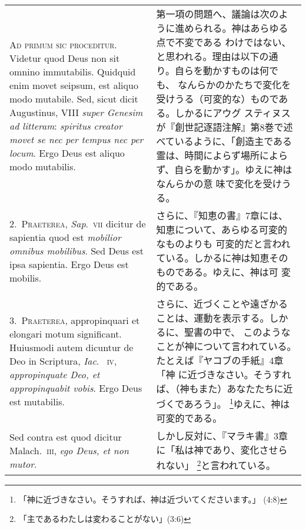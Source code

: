 \documentclass[10pt]{jsarticle} %
\begin{document}
\begin{longtable}{p{21em}p{21em}}
{\huge A}{\scshape d primum sic proceditur}. Videtur quod Deus non sit
omnino immutabilis.  Quidquid enim movet seipsum, est aliquo modo
mutabile. Sed, sicut dicit Augustinus, VIII {\it super Genesim ad
litteram}:  {\itshape spiritus creator movet se nec per tempus nec per
locum}. Ergo Deus est aliquo modo mutabilis.

& 

第一項の問題へ、議論は次のように進められる。神はあらゆる点で不変である
わけではない、と思われる。理由は以下の通り。自らを動かすものは何でも、
なんらかのかたちで変化を受けうる（可変的な）ものである。しかるにアウグ
スティヌスが『創世記逐語注解』第8巻で述べているように、「創造主である
霊は、時間によらず場所によらず、自らを動かす」。ゆえに神はなんらかの意
味で変化を受けうる。

\\

2.~{\scshape Praeterea}, {\it Sap}.~{\scshape vii} dicitur de
sapientia quod est {\itshape mobilior omnibus mobilibus}. Sed Deus est
ipsa sapientia. Ergo Deus est mobilis.

 &

さらに、『知恵の書』7章には、知恵について、あらゆる可変的なものよりも
可変的だと言われている。しかるに神は知恵そのものである。ゆえに、神は可
変的である。

\\

3.~{\scshape Praeterea}, appropinquari et elongari motum significant.
 Huiusmodi autem dicuntur de Deo in Scriptura, {\it Iac}.~{\scshape
 iv}, {\itshape appropinquate Deo, et appropinquabit vobis}. Ergo Deus
 est mutabilis.

&

さらに、近づくことや遠ざかることは、運動を表示する。しかるに、聖書の中で、
 このようなことが神について言われている。たとえば『ヤコブの手紙』4章「神
 に近づきなさい。そうすれば、（神もまた）あなたたちに近づくであろう」。
 \footnote{「神に近づきなさい。そうすれば、神は近づいてくださいます。」
 (4:8)}ゆえに、神は可変的である。

\\

Sed contra est quod dicitur Malach.~{\scshape iii}, {\itshape ego
 Deus, et non mutor}.

&

 しかし反対に、『マラキ書』3章に「私は神であり、変化させられない」
 \footnote{「主であるわたしは変わることがない」(3:6)}と言われている。



\end{longtable}
\end{document}
